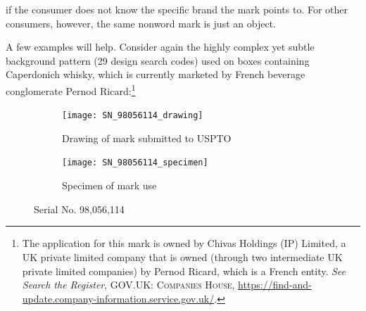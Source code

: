 \documentclass[letterpaper, 11pt, oneside]{article}
\begin{document}
if the consumer does not know the specific brand the mark points to. For other consumers, however, the same nonword mark is just an object. 

A few examples will help. Consider again the highly complex yet subtle background pattern (29 design search codes) used on boxes containing Caperdonich whisky, which is currently marketed by French beverage conglomerate Pernod Ricard:\footnote{The application for this mark is owned by Chivas Holdings (IP) Limited, a UK private limited company that is owned (through two intermediate UK private limited companies) by Pernod Ricard, which is a French entity. \textit{See Search the Register}, \textsc{GOV.UK: Companies House}, \url{https://find-and-update.company-information.service.gov.uk/}.}

\begin{figure}[H]
\centering
\begin{subfigure}[h]{0.2\linewidth}
\texttt{[image: SN\_98056114\_drawing]} \
\caption{Drawing of mark submitted to USPTO}
\end{subfigure}
\hspace{30pt}
\begin{subfigure}[h]{0.3\linewidth}
\texttt{[image: SN\_98056114\_specimen]} \
\caption{Specimen of mark use}
\end{subfigure}
\caption*{Serial No. 98,056,114}
\end{figure}
\par
\end{document}

